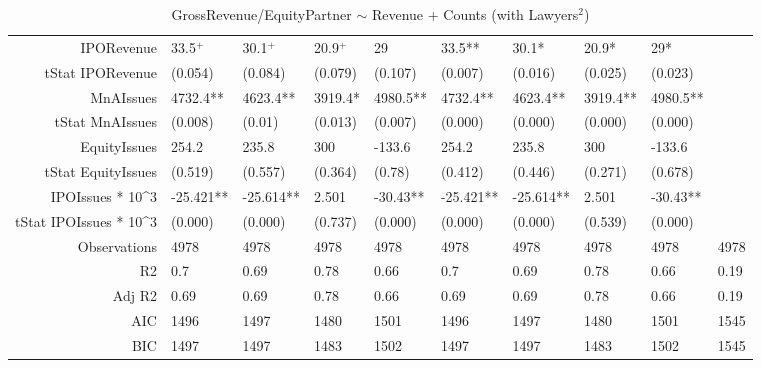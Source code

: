 \begin{table}[ht]
\begin{tabular}{rlllllllll}
  IPORevenue & 33.5$^{+}$ & 30.1$^{+}$ & 20.9$^{+}$ & 29 & 33.5** & 30.1* & 20.9* & 29* &  \\ 
  tStat IPORevenue & (0.054) & (0.084) & (0.079) & (0.107) & (0.007) & (0.016) & (0.025) & (0.023) &  \\ 
  MnAIssues & 4732.4** & 4623.4** & 3919.4* & 4980.5** & 4732.4** & 4623.4** & 3919.4** & 4980.5** &  \\ 
  tStat MnAIssues & (0.008) & (0.01) & (0.013) & (0.007) & (0.000) & (0.000) & (0.000) & (0.000) &  \\ 
  EquityIssues & 254.2 & 235.8 & 300 & -133.6 & 254.2 & 235.8 & 300 & -133.6 &  \\ 
  tStat EquityIssues & (0.519) & (0.557) & (0.364) & (0.78) & (0.412) & (0.446) & (0.271) & (0.678) &  \\ 
  IPOIssues * 10^3 & -25.421** & -25.614** & 2.501 & -30.43** & -25.421** & -25.614** & 2.501 & -30.43** &  \\ 
  tStat IPOIssues * 10^3 & (0.000) & (0.000) & (0.737) & (0.000) & (0.000) & (0.000) & (0.539) & (0.000) &  \\ 
  Observations & 4978 & 4978 & 4978 & 4978 & 4978 & 4978 & 4978 & 4978 & 4978 \\ 
  R2 & 0.7 & 0.69 & 0.78 & 0.66 & 0.7 & 0.69 & 0.78 & 0.66 & 0.19 \\ 
  Adj R2 & 0.69 & 0.69 & 0.78 & 0.66 & 0.69 & 0.69 & 0.78 & 0.66 & 0.19 \\ 
  AIC & 1496 & 1497 & 1480 & 1501 & 1496 & 1497 & 1480 & 1501 & 1545 \\ 
  BIC & 1497 & 1497 & 1483 & 1502 & 1497 & 1497 & 1483 & 1502 & 1545 \\ 
   \hline
\end{tabular}
\caption{GrossRevenue/EquityPartner $\sim$ Revenue + Counts (with Lawyers$^2$)} 
\end{table}
